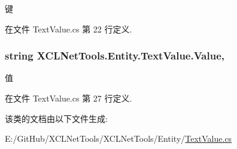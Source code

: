 键 



在文件 Text\+Value.\+cs 第 22 行定义.

\subsubsection[{\texorpdfstring{Value}{Value}}]{\setlength{\rightskip}{0pt plus 5cm}string X\+C\+L\+Net\+Tools.\+Entity.\+Text\+Value.\+Value\hspace{0.3cm}{\ttfamily [get]}, {\ttfamily [set]}}\hypertarget{class_x_c_l_net_tools_1_1_entity_1_1_text_value_a8a193486b942adc898433bd29db3eff7}{}\label{class_x_c_l_net_tools_1_1_entity_1_1_text_value_a8a193486b942adc898433bd29db3eff7}


值 



在文件 Text\+Value.\+cs 第 27 行定义.



该类的文档由以下文件生成\+:\begin{DoxyCompactItemize}
\item 
E\+:/\+Git\+Hub/\+X\+C\+L\+Net\+Tools/\+X\+C\+L\+Net\+Tools/\+Entity/\hyperlink{_text_value_8cs}{Text\+Value.\+cs}\end{DoxyCompactItemize}
